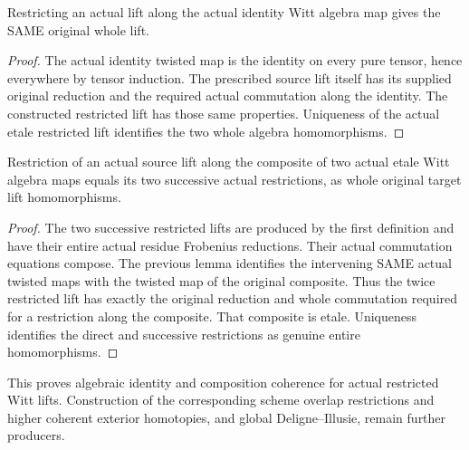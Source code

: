 \begin{theorem}
\label{thm:witt-two-etale-restricted-lift-identity}
\leanok
Restricting an actual lift along the actual identity Witt algebra
map gives the SAME original whole lift.
\end{theorem}
\begin{proof}
The actual identity twisted map is the identity on every pure
tensor, hence everywhere by tensor induction. The prescribed
source lift itself has its supplied original reduction and the
required actual commutation along the identity. The constructed
restricted lift has those same properties. Uniqueness of the
actual etale restricted lift identifies the two whole algebra
homomorphisms.
\end{proof}

\begin{theorem}
\label{thm:witt-two-etale-restricted-lift-composition}
\leanok
Restriction of an actual source lift along the composite of two
actual etale Witt algebra maps equals its two successive actual
restrictions, as whole original target lift homomorphisms.
\end{theorem}
\begin{proof}
The two successive restricted lifts are produced by the first
definition and have their entire actual residue Frobenius
reductions. Their actual commutation equations compose. The
previous lemma identifies the intervening SAME actual twisted
maps with the twisted map of the original composite. Thus the
twice restricted lift has exactly the original reduction and
whole commutation required for a restriction along the composite.
That composite is etale. Uniqueness identifies the direct and
successive restrictions as genuine entire homomorphisms.
\end{proof}

This proves algebraic identity and composition coherence for
actual restricted Witt lifts. Construction of the corresponding
scheme overlap restrictions and higher coherent exterior
homotopies, and global Deligne--Illusie, remain further producers.
